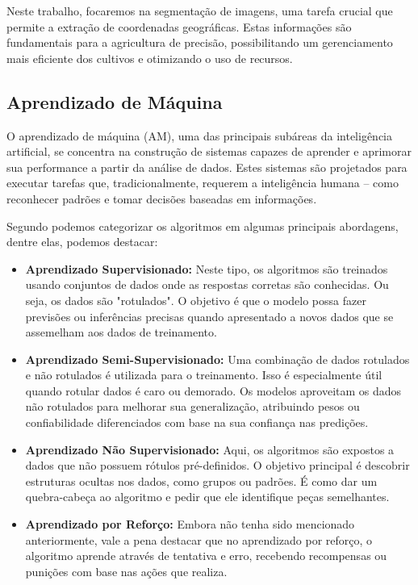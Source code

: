 \documentclass[conference]{IEEEtran}
\begin{document}
Neste trabalho, focaremos na segmentação de imagens, uma tarefa crucial que permite a extração de coordenadas
geográficas. Estas informações são fundamentais para a agricultura de precisão, possibilitando um gerenciamento
mais eficiente dos cultivos e otimizando o uso de recursos.

\subsection{Aprendizado de Máquina}
O aprendizado de máquina (AM), uma das principais subáreas da inteligência artificial, se concentra na 
construção de sistemas capazes de aprender e aprimorar sua performance a partir da análise de dados. 
Estes sistemas são projetados para executar tarefas que, tradicionalmente, requerem a inteligência 
humana – como reconhecer padrões e tomar decisões baseadas em informações.

Segundo \cite{faceli2022inteligencia} podemos categorizar os algoritmos em algumas principais 
abordagens, dentre elas, podemos destacar:

\begin{itemize}
    \item {\textbf{Aprendizado Supervisionado:}}
    Neste tipo, os algoritmos são treinados usando conjuntos de dados onde as respostas corretas são 
    conhecidas. Ou seja, os dados são "rotulados". O objetivo é que o modelo possa fazer previsões ou 
    inferências precisas quando apresentado a novos dados que se assemelham aos dados de treinamento.

    \item {\textbf{Aprendizado Semi-Supervisionado:}}
    Uma combinação de dados rotulados e não rotulados é utilizada para o treinamento. Isso é 
    especialmente útil quando rotular dados é caro ou demorado. Os modelos aproveitam os dados não 
    rotulados para melhorar sua generalização, atribuindo pesos ou confiabilidade diferenciados com 
    base na sua confiança nas predições.

    \item {\textbf{Aprendizado Não Supervisionado:}}
    Aqui, os algoritmos são expostos a dados que não possuem rótulos pré-definidos. O objetivo 
    principal é descobrir estruturas ocultas nos dados, como grupos ou padrões. É como dar um 
    quebra-cabeça ao algoritmo e pedir que ele identifique peças semelhantes.

    \item {\textbf{Aprendizado por Reforço:}}
    Embora não tenha sido mencionado anteriormente, vale a pena destacar que no aprendizado por reforço, 
    o algoritmo aprende através de tentativa e erro, recebendo recompensas ou punições com base nas 
    ações que realiza.
\end{itemize}
\end{document}
